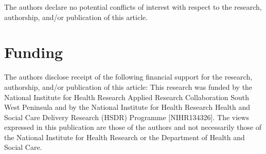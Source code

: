The authors declare no potential conflicts of interest with respect to the research, authorship, and/or publication of this article. 

\section{Funding}

The authors disclose receipt of the following financial support for the research, authorship, and/or publication of this article: This research was funded by the National Institute for Health Research Applied Research Collaboration South West Peninsula and by the National Institute for Health Research Health and Social Care Delivery Research (HSDR) Programme [NIHR134326]. The views expressed in this publication are those of the authors and not necessarily those of the National Institute for Health Research or the Department of Health and Social Care. 